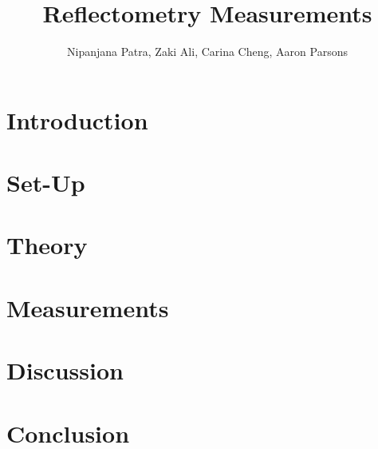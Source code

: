 \documentclass[12pt,preprint]{aastex}
\begin{document}
\title{Reflectometry Measurements} 
\author{Nipanjana Patra, Zaki Ali, Carina Cheng, Aaron Parsons}
\maketitle

\section{Introduction}

\section{Set-Up}

\section{Theory}

\section{Measurements}

\section{Discussion}

\section{Conclusion}
\end{document}

